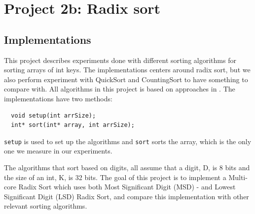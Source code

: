 
\chapter{Project 2b: Radix sort} %

\label{Chapter3} %




\section{Implementations}
This project describes experiments done with different sorting algorithms for sorting arrays of int keys. The implementations centers around radix sort, but we also perform experiment with QuickSort and CountingSort to have something to compare with.
All algorithms in this project is based on approaches in \citep{radixSort}.
The implementations have two methods:
\begin{lstlisting}
  void setup(int arrSize);
  int* sort(int* array, int arrSize);
\end{lstlisting}
\verb!setup! is used to set up the algorithms and \verb!sort! sorts the array, which is the only one we measure in our experiments.

The algorithms that sort based on digits, all assume that a digit, D, is 8 bits and the size of an int, K, is 32 bits.
The goal of this project is to implement a Multi-core Radix Sort which uses both Most Significant Digit (MSD) - and Lowest Significant Digit (LSD) Radix Sort, and compare this implementation with other relevant sorting algorithms.


